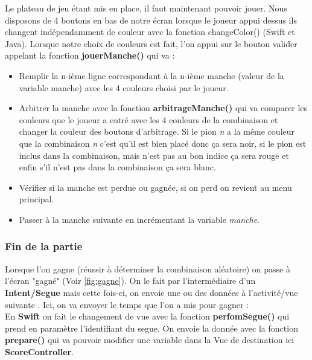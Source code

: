 \documentclass{article}
\begin{document}
Le plateau de jeu étant mis en place, il faut maintenant pouvoir jouer. Nous disposons de 4 boutons en bas de notre écran lorsque le joueur appui dessus ils changent indépendamment de couleur avec la fonction changeColor() (Swift et Java). Lorsque notre choix de couleurs est fait, l'on appui sur le bouton valider appelant la fonction \textbf{jouerManche()} qui va : 
\\
\begin{itemize}
\item Remplir la n-ième ligne correspondant à la n-ième manche (valeur de la variable manche) avec les 4 couleurs choisi par le joueur.
\\ 
\item Arbitrer la manche avec la fonction \textbf{arbitrageManche()} qui va comparer les couleurs que le joueur a entré avec les 4 couleurs de la combinaison et changer la couleur des boutons d'arbitrage. Si le pion \textit{n} a la même couleur que la combinaison \textit{n} c'est qu'il est bien placé donc ça sera noir, si le pion est inclus dans la combinaison, mais n'est pas au bon indice ça sera rouge et enfin s'il n'est pas dans la combinaison ça sera blanc. 
\\
\item Vérifier si la manche est perdue ou gagnée, si on perd on revient au menu principal. 
\\
\item Passer à la manche suivante en incrémentant la variable \textit{manche}. 
\\
\end{itemize}

\subsubsection{Fin de la partie}
\label{subsubsection:Fin de la partie}

Lorsque l'on gagne (réussir à déterminer la combinaison aléatoire) on passe à l'écran "gagné" (Voir \ref{fig:gagne}). On le fait par l'intermédiaire d'un \textbf{Intent/Segue} mais cette fois-ci, on envoie une ou des données à l'activité/vue suivante . Ici, on va envoyer le temps que l'on a mis pour gagner :
\\
En \textbf{Swift} on fait le changement de vue avec la fonction \textbf{perfomSegue()} qui prend en paramètre l'identifiant du segue. On envoie la donnée avec la fonction \textbf{prepare()} qui va pouvoir modifier une variable dans la Vue de destination ici \textbf{ScoreController}.
\end{document}

